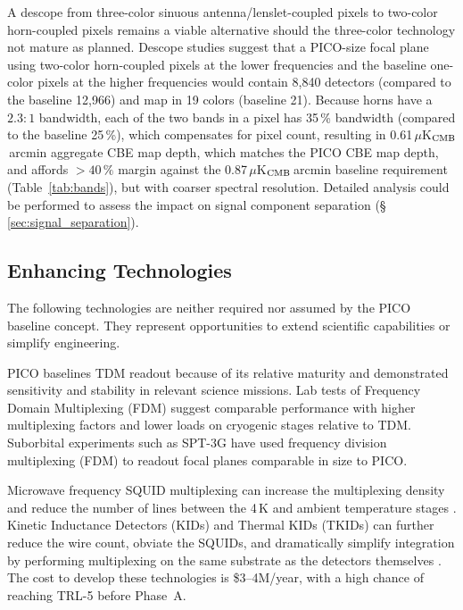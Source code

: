 A descope from three-color sinuous antenna/lenslet-coupled pixels to two-color horn-coupled pixels remains a viable
alternative should the three-color technology not mature as
planned. Descope studies suggest that a PICO-size focal plane using
two-color horn-coupled pixels at the lower frequencies and the baseline one-color
pixels at the higher frequencies would contain 8,840 detectors
(compared to the baseline 12,966) and map in 19 colors (baseline
21). Because horns have a $2.3:1$ bandwidth, each of the two bands in
a pixel has 35\,\% bandwidth (compared to the baseline 25\,\%), which
compensates for pixel count, resulting in
0.61\,$\mu$K$_{\rm CMB}$\,arcmin aggregate CBE map depth, which
matches the PICO CBE map depth, and affords $>40\,\%$ margin against
the 0.87\,$\mu$K$_{\rm CMB}$\,arcmin baseline requirement
(Table~\ref{tab:bands}), but with coarser spectral resolution.
Detailed analysis could be performed to assess the impact on signal component separation (\S\,\ref{sec:signal_separation}).

\subsection{Enhancing Technologies}
\label{sec:enhancing_technologies} %

The following technologies are neither required nor assumed by the
PICO baseline concept. They represent opportunities to extend
scientific capabilities or simplify engineering.

PICO baselines TDM readout because of its relative maturity and
demonstrated sensitivity and stability in relevant science
missions. Lab tests of Frequency Domain Multiplexing (FDM) suggest
comparable performance with higher multiplexing factors and lower
loads on cryogenic stages relative to TDM. Suborbital experiments such
as SPT-3G have used frequency division multiplexing (FDM) to readout
focal planes comparable in size to PICO.

Microwave frequency SQUID multiplexing can increase the multiplexing
density and reduce the number of lines between the 4\,K and ambient
temperature stages \citep{Dober2017,Irwin2004}. Kinetic Inductance
Detectors (KIDs) and Thermal KIDs (TKIDs) can further reduce the wire
count, obviate the SQUIDs, and dramatically simplify integration by
performing multiplexing on the same substrate as the detectors
themselves \citep{McCarrick2018,Steinbach2018,Johnson2018}. The cost to develop
these technologies is \$3--4M/year, with a high chance of reaching
TRL-5 before Phase~A.

